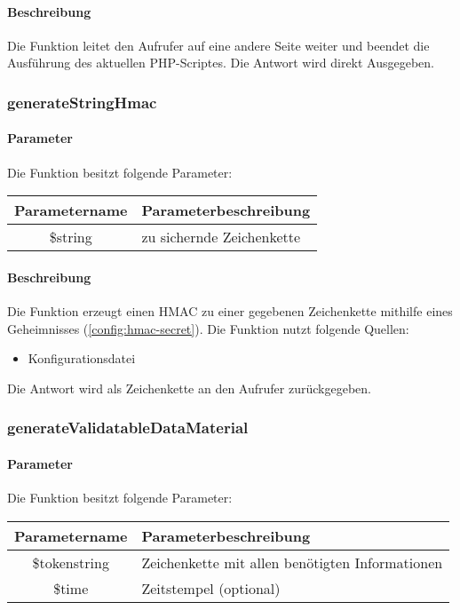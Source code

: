 \paragraph{Beschreibung} Die Funktion leitet den Aufrufer auf eine andere Seite weiter und beendet die Ausführung des aktuellen PHP-Scriptes. Die Antwort wird direkt Ausgegeben.
\subsubsection{generateStringHmac}
\paragraph{Parameter} Die Funktion besitzt folgende Parameter:
\begin{table}[H]
	\begin{tabular}{|c|p{11cm}|}
		\hline
		\textbf{Parametername} & \textbf{Parameterbeschreibung} \\ \hline
		\$string & zu sichernde Zeichenkette \\ \hline
	\end{tabular}
\end{table}
\paragraph{Beschreibung} Die Funktion erzeugt einen HMAC zu einer gegebenen Zeichenkette mithilfe eines Geheimnisses (\autoref{config:hmac-secret}). Die Funktion nutzt folgende Quellen:
\begin{itemize}
	\item Konfigurationsdatei
\end{itemize}
Die Antwort wird als Zeichenkette an den Aufrufer zurückgegeben.
\subsubsection{generateValidatableDataMaterial}
\paragraph{Parameter} Die Funktion besitzt folgende Parameter:
\begin{table}[H]
	\begin{tabular}{|c|p{11cm}|}
		\hline
		\textbf{Parametername} & \textbf{Parameterbeschreibung} \\ \hline
		\$tokenstring & Zeichenkette mit allen benötigten Informationen \\ \hline
		\$time        & Zeitstempel (optional) \\ \hline
	\end{tabular}
\end{table}
